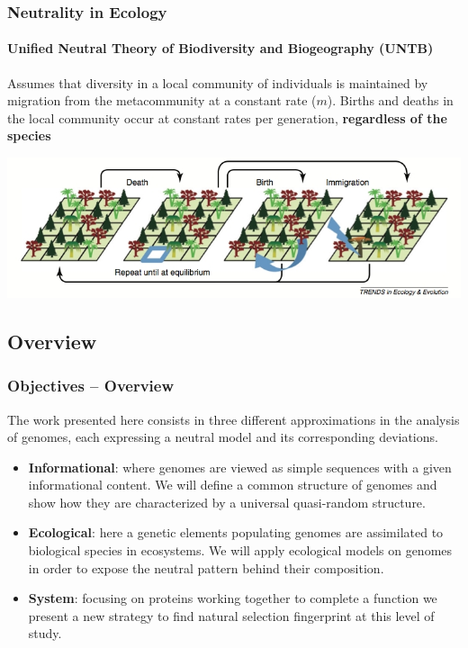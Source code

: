 \documentclass[hyperref={pagebackref=true},table]{beamer}
\begin{document}
\begin{frame}
  \frametitle{Neutrality in Ecology}
  \framesubtitle{Unified Neutral Theory of Biodiversity and Biogeography (UNTB)}
  Assumes that diversity in a local community of individuals is maintained by migration from the metacommunity at a constant rate ($m$). Births and deaths in the local community occur at constant rates per generation, \textbf{regardless of the species}
  \begin{center}
    \includegraphics[width=1\textwidth]{pictures/Intro/schema_untb.png}\\
    \hfill{\tiny\textit{\cite{Rosindell2011}}}
  \end{center}
\end{frame}

\subsection{Overview}
\begin{frame}
  \frametitle{Objectives -- Overview}
  The work presented here consists in three different approximations in the analysis of genomes, each expressing a neutral model and its corresponding deviations.
  \pause
  \begin{itemize}
  \item \textbf{Informational}: where genomes are viewed as simple sequences with a given informational content. We will define a common structure of genomes and show how they are characterized by a universal quasi-random structure.
  \pause
  \item \textbf{Ecological}: here a genetic elements populating genomes are assimilated to biological species in ecosystems. We will apply ecological models on genomes in order to expose the neutral pattern behind their composition.
  \pause
  \item \textbf{System}: focusing on proteins working together to complete a function we present a new strategy to find natural selection fingerprint at this level of study.
  \end{itemize}
\end{frame}
\end{document}
